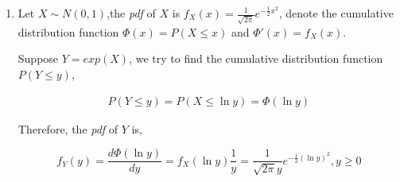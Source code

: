 \documentclass[a4paper]{article}
\begin{document}
\begin{enumerate}
\begin{enumerate}
\begin{proof}
      "$\Longleftarrow$": 

      Suppose $\EX[f(x)] \EX[g(y)] = \EX[f(x)g(y)]$, for all $A,B \in \mathbb{R}$
      Let $f(x)$ be the indicator random variable $f(x) = \mathbb{I}(x\in A)$, $g(y) = \mathbb{I}(y\in B)$
      \begin{equation}
        \begin{aligned}
          P(x\in A, y \in B) &= \EX[\mathbb{I}(x\in A)\mathbb{I}(y\in B)] = \EX[f(x)g(y)] \\
          & = \EX[f(x)]\EX[g(y)] = \EX[\mathbb{I}(x\in A)] \EX[\mathbb{I}(y\in B)] ] \\
          & = P(x\in A) P(y\in B)
        \end{aligned}
      \end{equation}

      So $P_{X,Y}(x,y) = P_X(x)P_Y(y)$ which means $X,Y$ are independent.
    \end{proof}
  \end{enumerate}

  \item Let $X\sim N(0,1)$,the \textit{pdf} of $X$ is $f_X(x) = \frac {1}{\sqrt{2\pi}} e^{-\frac 1 2 x^2}$, denote the cumulative distribution function $\Phi(x) = P(X\leqslant x )$ and  $\Phi'(x) = f_X(x)$.
  
  Suppose $Y = exp(X)$, we try to find the cumulative distribution function $P(Y\leqslant y)$,

  \begin{equation}
    \begin{aligned}
      P(Y\leqslant y) = P(X\leqslant \ln y) = \Phi(\ln y)
    \end{aligned}
  \end{equation}

  Therefore, the \textit{pdf} of $Y$ is,

  \begin{equation}
    f_Y(y) = \frac {d \Phi(\ln y)}{ dy} = f_X(\ln y) \frac 1 y = \frac {1}{\sqrt{2\pi} y} e^{-\frac 1 2 (\ln y)^2}, y \geqslant 0
  \end{equation}

  \end{enumerate}
    
\end{document}
